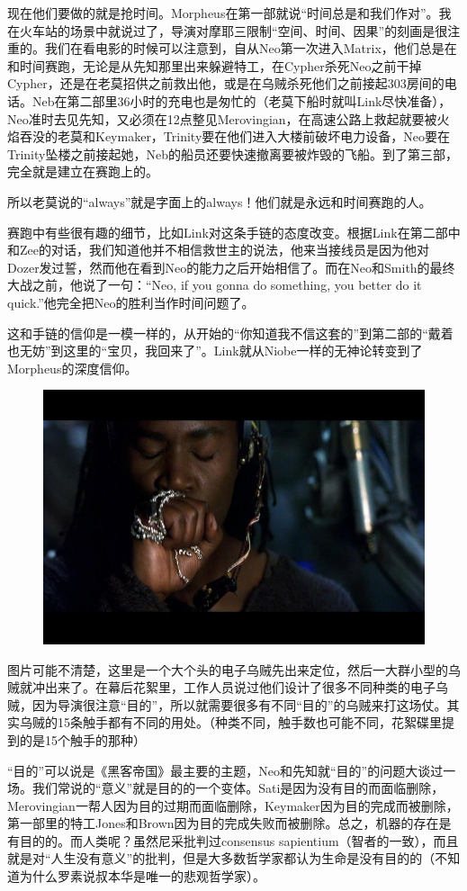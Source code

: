 \documentclass[UTF8]{ctexart}
\begin{document}
现在他们要做的就是抢时间。Morpheus在第一部就说“时间总是和我们作对”。我在火车站的场景中就说过了，导演对摩耶三限制“空间、时间、因果”的刻画是很注重的。我们在看电影的时候可以注意到，自从Neo第一次进入Matrix，他们总是在和时间赛跑，无论是从先知那里出来躲避特工，在Cypher杀死Neo之前干掉Cypher，还是在老莫招供之前救出他，或是在乌贼杀死他们之前接起303房间的电话。Neb在第二部里36小时的充电也是匆忙的（老莫下船时就叫Link尽快准备），Neo准时去见先知，又必须在12点整见Merovingian，在高速公路上救起就要被火焰吞没的老莫和Keymaker，Trinity要在他们进入大楼前破坏电力设备，Neo要在Trinity坠楼之前接起她，Neb的船员还要快速撤离要被炸毁的飞船。到了第三部，完全就是建立在赛跑上的。

所以老莫说的“always”就是字面上的always！他们就是永远和时间赛跑的人。

赛跑中有些很有趣的细节，比如Link对这条手链的态度改变。根据Link在第二部中和Zee的对话，我们知道他并不相信救世主的说法，他来当接线员是因为他对Dozer发过誓，然而他在看到Neo的能力之后开始相信了。而在Neo和Smith的最终大战之前，他说了一句：“Neo, if you gonna do something, you better do it quick.”他完全把Neo的胜利当作时间问题了。

这和手链的信仰是一模一样的，从开始的“你知道我不信这套的”到第二部的“戴着也无妨”到这里的“宝贝，我回来了”。Link就从Niobe一样的无神论转变到了Morpheus的深度信仰。

\begin{figure}[htb]
\centering
\includegraphics[width=0.5\linewidth]{fig/aea59e3d72117d00bba16754.jpg}
\end{figure}

图片可能不清楚，这里是一个大个头的电子乌贼先出来定位，然后一大群小型的乌贼就冲出来了。在幕后花絮里，工作人员说过他们设计了很多不同种类的电子乌贼，因为导演很注意“目的”，所以就需要很多有不同“目的”的乌贼来打这场仗。其实乌贼的15条触手都有不同的用处。（种类不同，触手数也可能不同，花絮碟里提到的是15个触手的那种）

“目的”可以说是《黑客帝国》最主要的主题，Neo和先知就“目的”的问题大谈过一场。我们常说的“意义”就是目的的一个变体。Sati是因为没有目的而面临删除，Merovingian一帮人因为目的过期而面临删除，Keymaker因为目的完成而被删除，第一部里的特工Jones和Brown因为目的完成失败而被删除。总之，机器的存在是有目的的。而人类呢？虽然尼采批判过consensus sapientium（智者的一致），而且就是对“人生没有意义”的批判，但是大多数哲学家都认为生命是没有目的的（不知道为什么罗素说叔本华是唯一的悲观哲学家）。
\end{document}
